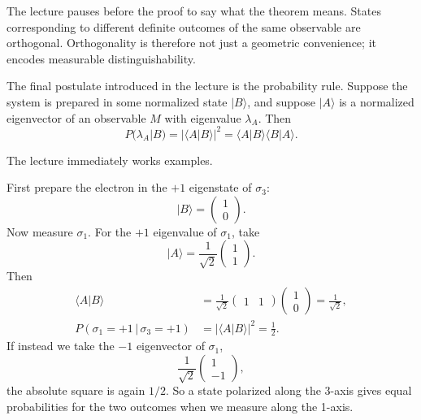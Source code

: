 The lecture pauses before the proof to say what the theorem means. States corresponding to different definite outcomes of the same observable are orthogonal. Orthogonality is therefore not just a geometric convenience; it encodes measurable distinguishability.

The final postulate introduced in the lecture is the probability rule. Suppose the system is prepared in some normalized state \(|B\rangle\), and suppose \(|A\rangle\) is a normalized eigenvector of an observable \(M\) with eigenvalue \(\lambda_A\). Then
\begin{equation}
P(\lambda_A|B)=|\langle A|B\rangle|^2=\langle A|B\rangle\langle B|A\rangle.
\end{equation}

The lecture immediately works examples.

First prepare the electron in the \(+1\) eigenstate of \(\sigma_3\):
\begin{equation}
|B\rangle=
\begin{pmatrix}
1\\
0
\end{pmatrix}.
\end{equation}
Now measure \(\sigma_1\). For the \(+1\) eigenvalue of \(\sigma_1\), take
\begin{equation}
|A\rangle=
\frac{1}{\sqrt{2}}
\begin{pmatrix}
1\\
1
\end{pmatrix}.
\end{equation}
Then
\begin{align}
\langle A|B\rangle
&=
\frac{1}{\sqrt{2}}
\begin{pmatrix}
1 & 1
\end{pmatrix}
\begin{pmatrix}
1\\
0
\end{pmatrix}
=
\frac{1}{\sqrt{2}},\\
P(\sigma_1=+1\,|\,\sigma_3=+1)
&=
\left|\langle A|B\rangle\right|^2
=
\frac{1}{2}.
\end{align}
If instead we take the \(-1\) eigenvector of \(\sigma_1\),
\begin{equation}
\frac{1}{\sqrt{2}}
\begin{pmatrix}
1\\
-1
\end{pmatrix},
\end{equation}
the absolute square is again \(1/2\). So a state polarized along the 3-axis gives equal probabilities for the two outcomes when we measure along the 1-axis.

